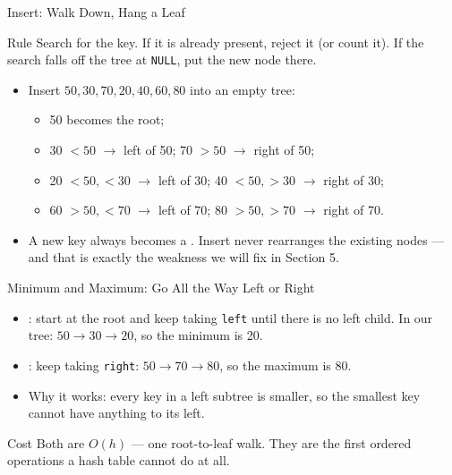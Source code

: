 \documentclass[aspectratio=169]{beamer}
\begin{document}
\begin{frame}{Insert: Walk Down, Hang a Leaf}
  \begin{block}{Rule}
    Search for the key. If it is already present, reject it (or count it).
    If the search falls off the tree at \texttt{NULL}, put the new node
    there.
  \end{block}
  \begin{itemize}
    \item Insert $50,30,70,20,40,60,80$ into an empty tree:
      \begin{itemize}
        \item 50 becomes the root;
        \item 30 $<50$ $\to$ left of 50; 70 $>50$ $\to$ right of 50;
        \item 20 $<50,<30$ $\to$ left of 30; 40 $<50,>30$ $\to$ right of 30;
        \item 60 $>50,<70$ $\to$ left of 70; 80 $>50,>70$ $\to$ right of 70.
      \end{itemize}
    \item A new key always becomes a . Insert never rearranges the
      existing nodes --- and that is exactly the weakness we will fix in
      Section 5.
  \end{itemize}
\end{frame}

\begin{frame}{Minimum and Maximum: Go All the Way Left or Right}
  \begin{itemize}
    \item {}: start at the root and keep taking \texttt{left}
      until there is no left child. In our tree: $50\to30\to20$, so the
      minimum is 20.
    \item {}: keep taking \texttt{right}: $50\to70\to80$, so the
      maximum is 80.
    \item Why it works: every key in a left subtree is smaller, so the
      smallest key cannot have anything to its left.
  \end{itemize}
  \begin{exampleblock}{Cost}
    Both are $O(h)$ --- one root-to-leaf walk. They are the first ordered
    operations a hash table cannot do at all.
  \end{exampleblock}
\end{frame}
\end{document}

